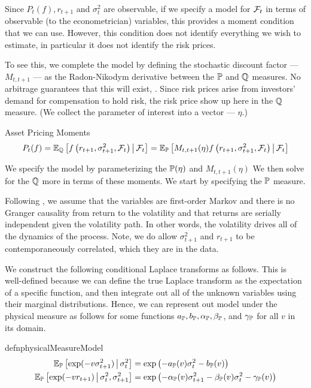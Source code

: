 \documentclass[11pt, letterpaper, twoside, final]{article}
\begin{document}
Since $P_t(f), r_{t+1}$ and $\sigma_t^2$ are observable, if we specify a model for $\mathcal{F}_t$ in terms of observable
(to the econometrician) variables, this provides a moment condition that we can use. 
However, this condition does not identify everything we wish to estimate, in particular it does not identify the
risk prices. 


To see this, we complete the model by defining the stochastic discount factor --- $M_{t, t+1}$ --- as the
Radon-Nikodym derivative between the $\mathbb{P}$ and $\mathbb{Q}$ measures. 
No arbitrage guarantees that this will exist, \parencite{harrison1978martingales}.
Since risk prices arise from investors' demand for compensation to hold risk, the risk price show up here 
in the $\mathbb{Q}$ measure. 
(We collect the parameter of interest into a vector --- $\eta$.)


\begin{defn}{Asset Pricing Moments}
    \begin{equation}
        P_t(f)  = \operatorname{\mathbb{E}}_{\mathbb{Q}} \left[f\left(r_{t+1}, \sigma^2_{t+1} , \mathcal{F}_t\right) \,\middle\vert\, \mathcal{F}_t \right] =
        \operatorname{\mathbb{E}}_{\mathbb{P}}\left[M_{t,t+1}(\eta)f\left(r_{t+1}, \sigma^2_{t+1}, \mathcal{F}_t\right) \,\middle\vert\, \mathcal{F}_t \right] 
    \end{equation}
\end{defn}

We specify the model by parameterizing the $\mathbb{P}(\eta)$ and $M_{t, t+1}(\eta)$
We then solve for the $\mathbb{Q}$ more in terms of these moments.
We start by specifying the $\mathbb{P}$ measure.

Following \textcite{khrapov2016affine}, we assume that the variables are first-order Markov and there is no
Granger causality from return to the volatility and that returns are serially independent given the volatility
path.
In other words, the volatility drives all of the dynamics of the process.
Note, we do allow $\sigma^2_{t+1}$ and $r_{t+1}$ to be contemporaneously correlated, which they are in the data. 

We construct the following conditional Laplace transforms as follows.
This is well-defined because we can define the true Laplace transform as the expectation of a specific function,
and then integrate out all of the unknown variables using their marginal distributions.
Hence, we can represent out model under the physical measure as follows for some functions $a_{\mathbb{P}}, b_{\mathbb{P}},
\alpha_{\mathbb{P}}, \beta_{\mathbb{P}}$, and $\gamma_{\mathbb{P}}$ for all $v$ in its domain.

\begin{restatable}{defn}{physicalMeasureModel}
    \label{defn:physical_model}
    \begin{align}
        \operatorname{\mathbb{E}}_{\mathbb{P}} \left[\exp(-v \sigma^2_{t+1}) \,\middle\vert\, \sigma^2_t \right] &= \exp\left( - a_{\mathbb{P}}(v) \sigma^2_t -
        b_{\mathbb{P}}(v) \right) \\
        \operatorname{\mathbb{E}}_{\mathbb{P}}\left[\exp(-v r_{t+1}) \,\middle\vert\, \sigma^2_t,  \sigma^2_{t+1}\right] &= \exp\left(- \alpha_{\mathbb{P}}(v)
        \sigma^2_{t+1} - \beta_{\mathbb{P}}(v)\sigma^2_t - \gamma_{\mathbb{P}}(v) \right) 
    \end{align}
\end{restatable}
\end{document}
